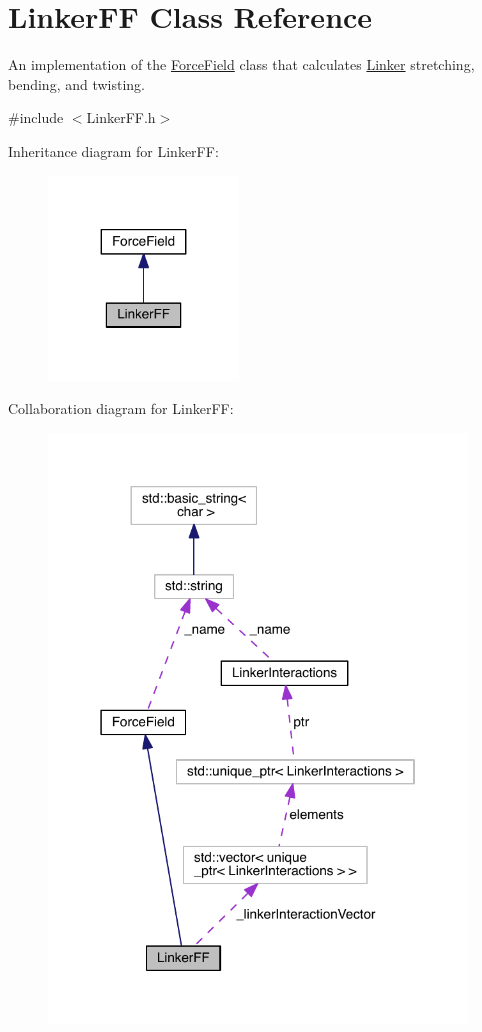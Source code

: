 \hypertarget{classLinkerFF}{\section{Linker\+F\+F Class Reference}
\label{classLinkerFF}
}


An implementation of the \hyperlink{classForceField}{Force\+Field} class that calculates \hyperlink{classLinker}{Linker} stretching, bending, and twisting.  




{\ttfamily \#include $<$Linker\+F\+F.\+h$>$}



Inheritance diagram for Linker\+F\+F\+:\nopagebreak
\begin{figure}[H]
\begin{center}
\leavevmode
\includegraphics[width=143pt]{classLinkerFF__inherit__graph}
\end{center}
\end{figure}


Collaboration diagram for Linker\+F\+F\+:
\nopagebreak
\begin{figure}[H]
\begin{center}
\leavevmode
\includegraphics[width=315pt]{classLinkerFF__coll__graph}
\end{center}
\end{figure}
